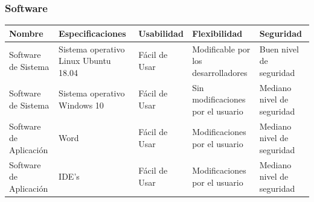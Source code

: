 \documentclass[10pt,executivepaper]{article}
\begin{document}
\subsubsection{Software}
\begin{tabular}{|p{2.5cm}|p{2.5cm}|p{2.5cm}|p{2.5cm}|p{2.5cm}|}
\hline
Nombre & Especificaciones & Usabilidad & Flexibilidad & Seguridad  \\\hline
Software de Sistema & Sistema operativo Linux Ubuntu 18.04 & Fácil de Usar & Modificable por los desarrolladores & Buen nivel de seguridad \\\hline
Software de Sistema & Sistema operativo Windows 10 & Fácil de Usar & Sin modificaciones por el usuario & Mediano nivel de seguridad  \\\hline
Software de Aplicación & Word & Fácil de Usar & Modificaciones por el usuario & Mediano nivel de seguridad  \\\hline
Software de Aplicación & IDE's & Fácil de Usar & Modificaciones por el usuario & Mediano nivel de seguridad  \\\hline
\end{tabular}

\vspace{0.5cm}
\end{document}

